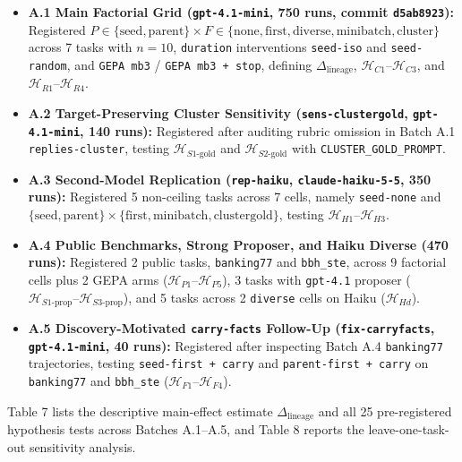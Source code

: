 \documentclass[10pt]{article}
\providecommand{\tightlist}{%
  \setlength{\itemsep}{0pt}\setlength{\parskip}{0pt}}
\begin{document}
\begin{itemize}
\tightlist
\item
  \textbf{A.1 Main Factorial Grid (\texttt{gpt-4.1-mini}, 750 runs,
  commit \texttt{d5ab8923}):} Registered
  \(P \in \{\text{seed}, \text{parent}\} \times F \in \{\text{none}, \text{first}, \text{diverse}, \text{minibatch}, \text{cluster}\}\)
  across 7 tasks with \(n=10\), \texttt{duration} interventions
  \texttt{seed-iso} and \texttt{seed-random}, and \texttt{GEPA\ mb3} /
  \texttt{GEPA\ mb3\ +\ stop}, defining \(\Delta_{\text{lineage}}\),
  \(\mathcal{H}_{C1}\text{--}\mathcal{H}_{C3}\), and
  \(\mathcal{H}_{R1}\text{--}\mathcal{H}_{R4}\).
\item
  \textbf{A.2 Target-Preserving Cluster Sensitivity
  (\texttt{sens-clustergold}, \texttt{gpt-4.1-mini}, 140 runs):}
  Registered after auditing rubric omission in Batch A.1
  \texttt{replies-cluster}, testing \(\mathcal{H}_{S1\text{-gold}}\) and
  \(\mathcal{H}_{S2\text{-gold}}\) with \texttt{CLUSTER\_GOLD\_PROMPT}.
\item
  \textbf{A.3 Second-Model Replication (\texttt{rep-haiku},
  \texttt{claude-haiku-5-5}, 350 runs):} Registered 5 non-ceiling tasks
  across 7 cells, namely \texttt{seed-none} and
  \(\{\text{seed}, \text{parent}\} \times \{\text{first}, \text{minibatch}, \text{clustergold}\}\),
  testing \(\mathcal{H}_{H1}\text{--}\mathcal{H}_{H3}\).
\item
  \textbf{A.4 Public Benchmarks, Strong Proposer, and Haiku Diverse (470
  runs):} Registered 2 public tasks, \texttt{banking77} and
  \texttt{bbh\_ste}, across 9 factorial cells plus 2 GEPA arms
  (\(\mathcal{H}_{P1}\text{--}\mathcal{H}_{P5}\)), 3 tasks with
  \texttt{gpt-4.1} proposer
  (\(\mathcal{H}_{S1\text{-prop}}\text{--}\mathcal{H}_{S3\text{-prop}}\)),
  and 5 tasks across 2 \texttt{diverse} cells on Haiku
  (\(\mathcal{H}_{Hd}\)).
\item
  \textbf{A.5 Discovery-Motivated \texttt{carry-facts} Follow-Up
  (\texttt{fix-carryfacts}, \texttt{gpt-4.1-mini}, 40 runs):} Registered
  after inspecting Batch A.4 \texttt{banking77} trajectories, testing
  \texttt{seed-first\ +\ carry} and \texttt{parent-first\ +\ carry} on
  \texttt{banking77} and \texttt{bbh\_ste}
  (\(\mathcal{H}_{F1}\text{--}\mathcal{H}_{F4}\)).
\end{itemize}

Table 7 lists the descriptive main-effect estimate
\(\Delta_{\text{lineage}}\) and all 25 pre-registered hypothesis tests
across Batches A.1--A.5, and Table 8 reports the leave-one-task-out
sensitivity analysis.
\end{document}
